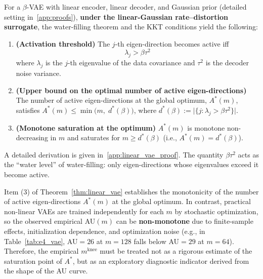 \documentclass[make,article,submit,pdftex,moreauthors]{Definitions/mdpi}
\newcommand{\mknee}{m^{\mathrm{knee}}}
\begin{document}
\begin{Theorem}\label{thm:linear_vae}
For a $\beta$-VAE with linear encoder, linear decoder, and Gaussian prior
(detailed setting in~\ref{app:proofs}),
\textbf{under the linear-Gaussian rate--distortion surrogate},
the water-filling theorem and the KKT conditions yield the following:

\begin{enumerate}
  \item \textbf{(Activation threshold)} The $j$-th eigen-direction becomes active iff
        \begin{equation}
          \lambda_j > \beta \tau^2 \label{eq:au_threshold}
        \end{equation}
        where $\lambda_j$ is the $j$-th eigenvalue of the data covariance and
        $\tau^2$ is the decoder noise variance.
  \item \textbf{(Upper bound on the optimal number of active eigen-directions)}
        The number of active eigen-directions at the global optimum, $A^*(m)$,
        satisfies $A^*(m) \leq \min\bigl(m,\; d^*(\beta)\bigr)$, where
        $d^*(\beta) := \bigl|\{j : \lambda_j > \beta\tau^2\}\bigr|$.
  \item \textbf{(Monotone saturation at the optimum)}
        $A^*(m)$ is monotone non-decreasing in $m$ and saturates for
        $m \geq d^*(\beta)$ (i.e., $A^*(m) = d^*(\beta)$).
\end{enumerate}

\noindent
A detailed derivation is given in~\ref{app:linear_vae_proof}.
The quantity $\beta\tau^2$ acts as the ``water level'' of water-filling:
only eigen-directions whose eigenvalues exceed it become active.
\end{Theorem}

\begin{Remark}
Item (3) of Theorem~\ref{thm:linear_vae} establishes the monotonicity of the number of
active eigen-directions $A^*(m)$ at the global optimum.
In contrast, practical non-linear VAEs are trained independently for each $m$ by
stochastic optimization, so the observed empirical AU$(m)$ can be
\textbf{non-monotone} due to finite-sample effects, initialization dependence, and
optimization noise
(e.g., in Table~\ref{tab:e4_vae}, AU$=26$ at $m=128$ falls below AU$=29$ at $m=64$).
Therefore, the empirical $\mknee$ must be treated not as a rigorous estimate of the
saturation point of $A^*$, but as an exploratory diagnostic indicator derived from the
shape of the AU curve.
\end{Remark}
\end{document}
